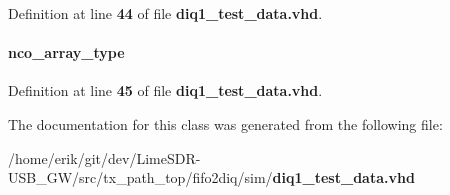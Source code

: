 Definition at line {\bf 44} of file {\bf diq1\+\_\+test\+\_\+data.\+vhd}.

\paragraph[{nco\+\_\+siso\+\_\+Q}]{ {\bfseries {\bfseries {\bf nco\+\_\+array\+\_\+type}} \textcolor{vhdlchar}{ }} \hspace{0.3cm}{\ttfamily [Signal]}}\label{classdiq1__test__data_1_1arch_aa44d9a959ad0891435195b4141afd611}


Definition at line {\bf 45} of file {\bf diq1\+\_\+test\+\_\+data.\+vhd}.



The documentation for this class was generated from the following file\+:\begin{DoxyCompactItemize}
\item 
/home/erik/git/dev/\+Lime\+S\+D\+R-\/\+U\+S\+B\+\_\+\+G\+W/src/tx\+\_\+path\+\_\+top/fifo2diq/sim/{\bf diq1\+\_\+test\+\_\+data.\+vhd}\end{DoxyCompactItemize}

